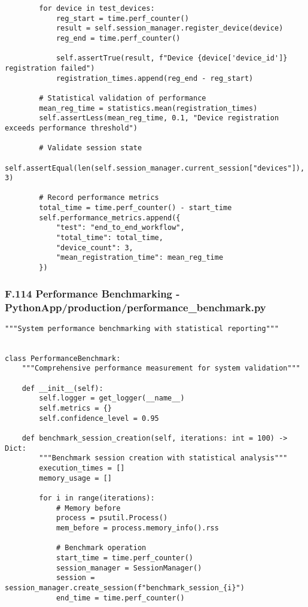 \documentclass[11pt,a4paper]{report}
\begin{document}
{{\begin{verbatim}
        for device in test_devices:
            reg_start = time.perf_counter()
            result = self.session_manager.register_device(device)
            reg_end = time.perf_counter()

            self.assertTrue(result, f"Device {device['device_id']} registration failed")
            registration_times.append(reg_end - reg_start)

        # Statistical validation of performance
        mean_reg_time = statistics.mean(registration_times)
        self.assertLess(mean_reg_time, 0.1, "Device registration exceeds performance threshold")

        # Validate session state
        self.assertEqual(len(self.session_manager.current_session["devices"]), 3)

        # Record performance metrics
        total_time = time.perf_counter() - start_time
        self.performance_metrics.append({
            "test": "end_to_end_workflow",
            "total_time": total_time,
            "device_count": 3,
            "mean_registration_time": mean_reg_time
        })
\end{verbatim}

\subsubsection{F.114 Performance Benchmarking - PythonApp/production/performance_benchmark.py}

\begin{verbatim}
"""System performance benchmarking with statistical reporting"""


class PerformanceBenchmark:
    """Comprehensive performance measurement for system validation"""

    def __init__(self):
        self.logger = get_logger(__name__)
        self.metrics = {}
        self.confidence_level = 0.95

    def benchmark_session_creation(self, iterations: int = 100) -> Dict:
        """Benchmark session creation with statistical analysis"""
        execution_times = []
        memory_usage = []

        for i in range(iterations):
            # Memory before
            process = psutil.Process()
            mem_before = process.memory_info().rss

            # Benchmark operation
            start_time = time.perf_counter()
            session_manager = SessionManager()
            session = session_manager.create_session(f"benchmark_session_{i}")
            end_time = time.perf_counter()


\end{verbatim}}}
\end{document}
